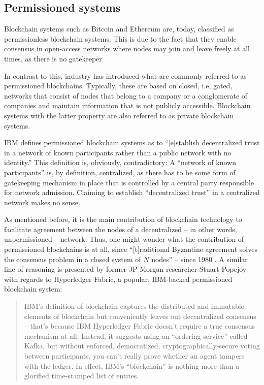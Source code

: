 \subsection{Permissioned systems}

Blockchain systems such as Bitcoin and Ethereum are, today, classified as permissionless blockchain systems.
This is due to the fact that they enable consensus in open-access networks where nodes may join and leave freely at all times, as there is no gatekeeper.

In contrast to this, industry has introduced what are commonly referred to as permissioned blockchains.
Typically, these are based on closed, i.e, gated, networks that consist of nodes that belong to a company or a conglomerate of companies and maintain information that is not publicly accessible.
Blockchain systems with the latter property are also referred to as private blockchain systems.

IBM defines permissioned blockchain systems as to ``[e]stablish decentralized trust in a network of known participants rather than a public network with no identity.'' \autocite{ibm2021hyperledger}
This definition is, obviously, contradictory:
A ``network of known participants'' is, by definition, centralized, as there has to be some form of gatekeeping mechanism in place that is controlled by a central party responsible for network admission.
Claiming to establish ``decentralized trust'' in a centralized network makes no sense.

As mentioned before, it is the main contribution of blockchain technology to facilitate agreement between the nodes of a decentralized -- in other words, unpermissioned -- network.
Thus, one might wonder what the contribution of permissioned blockchains is at all, since ``[t]raditional Byzantine agreement solves the consensus problem in a closed system of $N$ nodes'' \autocite[1]{mazieres2019simplescp} -- since 1980 \autocite{lamport1980}.
A similar line of reasoning is presented by former JP Morgan researcher Stuart Popejoy with regards to Hyperledger Fabric, a popular, IBM-backed permissioned blockchain system: \autocite{thenextweb2019hyperledgerrealblockchain}

\begin{quote}
	IBM's definition of blockchain captures the distributed and immutable elements of blockchain but conveniently leaves out decentralized consensus -- that's because IBM Hyperledger Fabric doesn't require a true consensus mechanism at all.
	Instead, it suggests using an ``ordering service'' called Kafka, but without enforced, democratized, cryptographically-secure voting between participants, you can’t really prove whether an agent tampers with the ledger. In effect, IBM’s ``blockchain'' is nothing more than a glorified time-stamped list of entries.
\end{quote}


